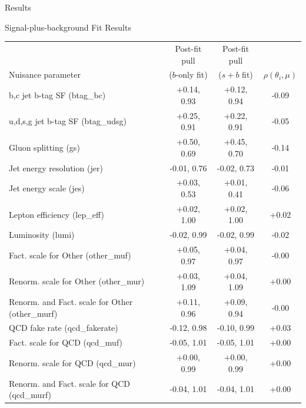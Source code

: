 \begin{section}{Results}
\begin{subsection}{Signal-plus-background Fit Results}
\begin{table}[tbp!]
\begin{center}
\begin{tabular}{|l|c|c|c|} \hline
                                                  &  Post-fit pull   &  Post-fit pull  &                         \\
Nuisance parameter                                &  ($b$-only fit)  &  ($s+b$ fit)    & $\rho(\theta_{i}, \mu)$ \\  
\hline
b,c jet b-tag SF (btag\_bc)                       &  +0.14, 0.93     &  +0.12, 0.94    &  -0.09                  \\
u,d,s,g jet b-tag SF (btag\_udsg)                 &  +0.25, 0.91     &  +0.22, 0.91    &  -0.05                  \\
Gluon splitting (gs)                              &  +0.50, 0.69     &  +0.45, 0.70    &  -0.14                  \\
Jet energy resolution (jer)                       &  -0.01, 0.76     &  -0.02, 0.73    &  -0.01                  \\
Jet energy scale (jes)                            &  +0.03, 0.53     &  +0.01, 0.41    &  -0.06                  \\
Lepton efficiency (lep\_eff)                      &  +0.02, 1.00     &  +0.02, 1.00    &  +0.02                  \\
Luminosity (lumi)                                 &  -0.02, 0.99     &  -0.02, 0.99    &  -0.02                  \\
Fact. scale for Other (other\_muf)                &  +0.05, 0.97     &  +0.04, 0.97    &  -0.00                  \\
Renorm. scale for Other (other\_mur)              &  +0.03, 1.09     &  +0.04, 1.09    &  +0.00                  \\
Renorm. and Fact. scale for Other (other\_murf)   &  +0.11, 0.96     &  +0.09, 0.94    &  -0.00                  \\
QCD fake rate (qcd\_fakerate)                     &  -0.12, 0.98     &  -0.10, 0.99    &  +0.03                  \\
Fact. scale for QCD (qcd\_muf)                    &  -0.05, 1.01     &  -0.05, 1.01    &  +0.00                  \\
Renorm. scale for QCD (qcd\_mur)                  &  +0.00, 0.99     &  +0.00, 0.99    &  +0.00                  \\
Renorm. and Fact. scale for QCD (qcd\_murf)       &  -0.04, 1.01     &  -0.04, 1.01    &  +0.00                  \\

\end{tabular}
\end{center}
\end{table}
\end{subsection}
\end{section}

